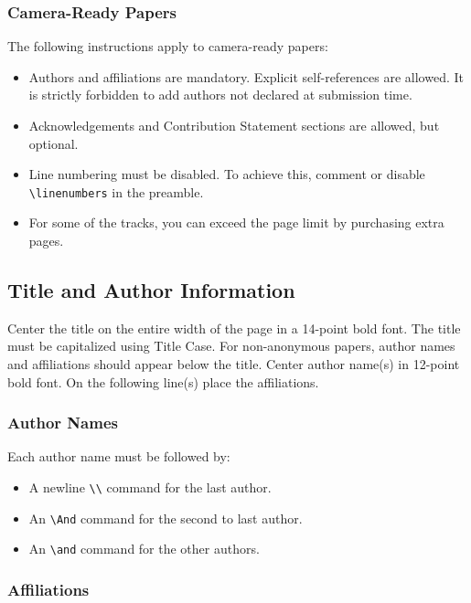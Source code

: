 \documentclass{article}
\begin{document}
\subsubsection{Camera-Ready Papers}
The following instructions apply to camera-ready papers:

\begin{itemize}
\item Authors and affiliations are mandatory. Explicit self-references are allowed. It is strictly forbidden to add authors not declared at submission time.

\item Acknowledgements and Contribution Statement sections are allowed, but optional.

\item Line numbering must be disabled. To achieve this, comment or disable {\tt \textbackslash{}linenumbers} in the preamble.

\item For some of the tracks, you can exceed the page limit by purchasing extra pages.
\end{itemize}

\subsection{Title and Author Information}

Center the title on the entire width of the page in a 14-point bold
font. The title must be capitalized using Title Case. For non-anonymous papers, author names and affiliations should appear below the title. Center author name(s) in 12-point bold font. On the following line(s) place the affiliations.

\subsubsection{Author Names}

Each author name must be followed by:
\begin{itemize}
    \item A newline {\tt \textbackslash{}\textbackslash{}} command for the last author.
    \item An {\tt \textbackslash{}And} command for the second to last author.
    \item An {\tt \textbackslash{}and} command for the other authors.
\end{itemize}

\subsubsection{Affiliations}
\end{document}
